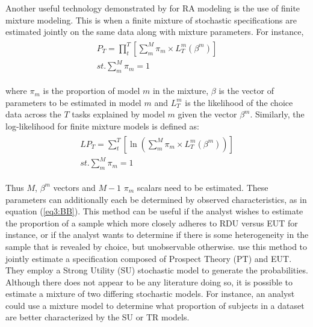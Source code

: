 \documentclass[../main.tex]{subfiles}
\begin{document}
\addtocounter{footnote}{-1}


Another useful technology demonstrated by \textcite{Harrison2008a} for RA modeling is the use of finite mixture modeling.
This is when a finite mixture of stochastic specifications are estimated jointly on the same data along with mixture parameters.
For instance,
\begin{align}
	\label{eq3:PT_Mix}
	\begin{split}
		\bm{\mathit{P_T}} = \prod_t^T \left[ \sum_m^M \pi_m \times L_T^m(\beta^m) \right]\\ 
		\mathit{st.} \sum_m^M \pi_m = 1
	\end{split}
\end{align}

\noindent where $\pi_m$ is the proportion of model $m$ in the mixture, $\beta$ is the vector of parameters to be estimated in model $m$ and $L_T^m$ is the likelihood of the choice data across the $T$ tasks explained by model $m$ given the vector $\beta^m$.
Similarly, the log-likelihood for finite mixture models is defined as:
\begin{align}
	\label{eq3:LPT_Mix}
	\begin{split}
		\bm{\mathit{LP_T}} = \sum_t^T \left[ \ln \left( \sum_m^M \pi_m \times L_T^m(\beta^m) \right) \right]\\ 
		\mathit{st.} \sum_m^M \pi_m = 1
	\end{split}
\end{align}

\noindent Thus $M$, $\beta^m$ vectors and $M-1$ $\pi_m$ scalars need to be estimated.
These parameters can additionally each be determined by observed characteristics, as in equation (\ref{eq3:BB}).
This method can be useful if the analyst wishes to estimate the proportion of a sample which more closely adheres to RDU versus EUT for instance, or if the analyst wants to determine if there is some heterogeneity in the sample that is revealed by choice, but unobservable otherwise.
\textcite[141]{Harrison2008a} use this method to jointly estimate a specification composed of Prospect Theory (PT) and EUT.
They employ a Strong Utility (SU) stochastic model to generate the probabilities.
Although there does not appear to be any literature doing so, it is possible to estimate a mixture of two differing stochastic models.
For instance, an analyst could use a mixture model to determine what proportion of subjects in a dataset are better characterized by the SU or TR models.{\footnotemark}
\end{document}
